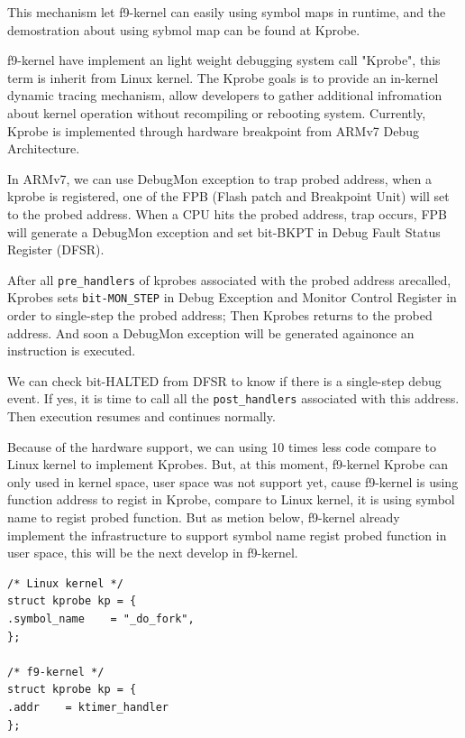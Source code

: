 \documentclass[10pt,preprint,nocopyrightspace]{sigplanconf}
\begin{document}
This mechanism let f9-kernel can easily using symbol maps in runtime, and the demostration about using sybmol map can be found at Kprobe.

f9-kernel have implement an light weight debugging system call "Kprobe", this term is inherit from Linux kernel. The Kprobe goals is to provide an in-kernel dynamic tracing mechanism, allow developers to gather additional infromation about kernel operation without recompiling or rebooting system. Currently, Kprobe is implemented through hardware breakpoint from ARMv7 Debug Architecture. 

In ARMv7, we can use DebugMon exception to trap probed address\cite{yiu2013definitive}, when a kprobe is registered, one of the FPB (Flash patch and Breakpoint Unit) will set to the probed address. When a CPU hits the probed address, trap occurs, FPB will generate a DebugMon exception and set bit-BKPT in Debug Fault Status Register (DFSR).

After all \texttt{pre\_handlers} of kprobes associated with the probed address arecalled, Kprobes sets \texttt{bit-MON\_STEP} in Debug Exception and Monitor Control Register in order to single-step the probed address; Then Kprobes returns to
the probed address. And soon a DebugMon exception will be generated againonce an instruction is executed.

We can check bit-HALTED from DFSR to know if there is a single-step debug event. If yes, it is time to call all the \texttt{post\_handlers} associated with this address. Then execution resumes and continues normally.

Because of the hardware support, we can using 10 times less code compare to Linux kernel to implement Kprobes. But, at this moment, f9-kernel Kprobe can only used in kernel space, user space was not support yet, cause f9-kernel is using function address to regist in Kprobe, compare to Linux kernel, it is using symbol name to regist 
probed function. But as metion below, f9-kernel already implement the infrastructure to support symbol name regist probed function in user space, this will be the next develop in f9-kernel.

\begin{lstlisting}[basicstyle=\small,frame=single]
/* Linux kernel */
struct kprobe kp = {
.symbol_name    = "_do_fork",
};

/* f9-kernel */
struct kprobe kp = {
.addr    = ktimer_handler
};

\end{lstlisting}
\end{document}
